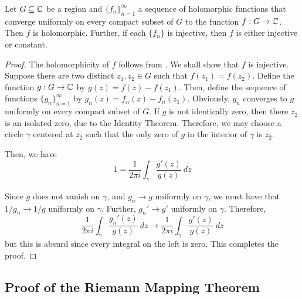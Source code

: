 \begin{proposition}
    Let $G\subseteq\mathbb{C}$ be a region and $\{f_n\}_{n = 1}^\infty$ a sequence of holomorphic functions that converge uniformly on every compact subset of $G$ to the function $f: G\to\mathbb{C}$. Then $f$ is holomorphic. Further, if each $\{f_n\}$ is injective, then $f$ is either injective or constant.
\end{proposition}
\begin{proof}
    The holomorphicity of $f$ follows from . We shall show that $f$ is injective. Suppose there are two distinct $z_1,z_2\in G$ such that $f(z_1) = f(z_2)$. Define the function $g: G\to\mathbb{C}$ by $g(z) = f(z) - f(z_1)$. Then, define the sequence of functions $\{g_n\}_{n = 1}^\infty$ by $g_n(z) = f_n(z) - f_n(z_1)$. Obviously, $g_n$ converges to $g$ uniformly on every compact subset of $G$. If $g$ is not identically zero, then there $z_2$ is an isolated zero, due to the Identity Theorem. Therefore, we may choose a circle $\gamma$ centered at $z_2$ such that the only zero of $g$ in the interior of $\gamma$ is $z_2$.

    Then, we have 
    \begin{equation*}
        1 = \frac{1}{2\pi i}\int_\gamma\frac{g'(z)}{g(z)}~dz
    \end{equation*}

    Since $g$ does not vanish on $\gamma$, and $g_n\to g$ uniformly on $\gamma$, we must have that $1/g_n\to 1/g$ uniformly on $\gamma$. Further, $g_n'\to g'$ uniformly on $\gamma$. Therefore, 
    \begin{equation*}
        \frac{1}{2\pi i}\int_\gamma\frac{g_n'(z)}{g(z)}~dz\to\frac{1}{2\pi i}\int_\gamma\frac{g'(z)}{g(z)}~dz
    \end{equation*}
    but this is absurd since every integral on the left is zero. This completes the proof.
\end{proof}

\subsection{Proof of the Riemann Mapping Theorem}

